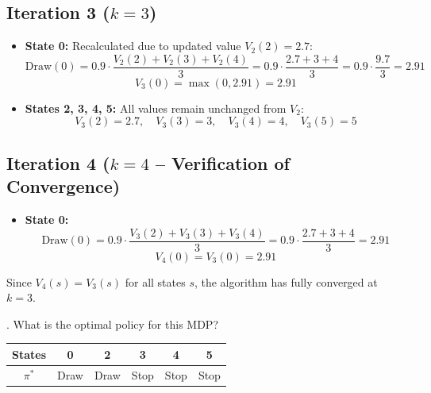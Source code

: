 \documentclass{article}
\begin{document}
\subsection*{Iteration 3 ($k = 3$)}
\begin{itemize}
    \item \textbf{State 0:} Recalculated due to updated value $V_2(2) = 2.7$:
    $$\text{Draw}(0) = 0.9 \cdot \frac{V_2(2) + V_2(3) + V_2(4)}{3} = 0.9 \cdot \frac{2.7 + 3 + 4}{3} = 0.9 \cdot \frac{9.7}{3} = 2.91$$
    $$V_3(0) = \max(0, 2.91) = 2.91$$
    
    \item \textbf{States 2, 3, 4, 5:} All values remain unchanged from $V_2$:
    $$V_3(2) = 2.7, \quad V_3(3) = 3, \quad V_3(4) = 4, \quad V_3(5) = 5$$
\end{itemize}

\subsection*{Iteration 4 ($k = 4$ -- Verification of Convergence)}
\begin{itemize}
    \item \textbf{State 0:} 
    $$\text{Draw}(0) = 0.9 \cdot \frac{V_3(2) + V_3(3) + V_3(4)}{3} = 0.9 \cdot \frac{2.7 + 3 + 4}{3} = 2.91$$
    $$V_4(0) = V_3(0) = 2.91$$
\end{itemize}
\noindent Since $V_4(s) = V_3(s)$ for all states $s$, the algorithm has fully converged at $k = 3$.

\vspace{0.5cm}
. What is the optimal policy for this MDP?

\vspace{0.3cm}
\begin{center}
\renewcommand{\arraystretch}{2}
\begin{tabular}{|c|c|c|c|c|c|}
\hline
\textbf{States} & \textbf{0} & \textbf{2} & \textbf{3} & \textbf{4} & \textbf{5} \\
\hline
$\pi^*$ & Draw & Draw & Stop & Stop & Stop \\
\hline
\end{tabular}
\end{center}
\end{document}
